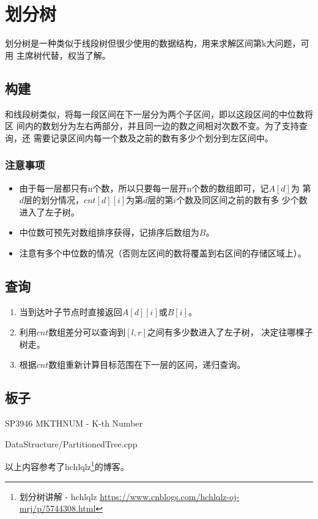 \section{划分树}
划分树是一种类似于线段树但很少使用的数据结构，用来求解区间第k大问题，可用
主席树代替，权当了解。
\subsection{构建}
和线段树类似，将每一段区间在下一层分为两个子区间，即以这段区间的中位数将区
间内的数划分为左右两部分，并且同一边的数之间相对次数不变。为了支持查询，还
需要记录区间内每一个数及之前的数有多少个划分到左区间中。
\subsubsection{注意事项}
\begin{itemize}
    \item 由于每一层都只有n个数，所以只要每一层开n个数的数组即可，记$A[d]$为
    第$d$层的划分情况，$cnt[d][i]$为第$d$层的第$i$个数及同区间之前的数有多
    少个数进入了左子树。
    \item 中位数可预先对数组排序获得，记排序后数组为$B$。
    \item 注意有多个中位数的情况（否则左区间的数将覆盖到右区间的存储区域上）。
\end{itemize}
\subsection{查询}

\begin{enumerate}
    \item 当到达叶子节点时直接返回$A[d][i]$或$B[i]$。
    \item 利用$cnt$数组差分可以查询到$[l,r]$之间有多少数进入了左子树，
    决定往哪棵子树走。
    \item 根据$cnt$数组重新计算目标范围在下一层的区间，递归查询。
\end{enumerate}

\subsection{板子}

SP3946 MKTHNUM - K-th Number


{DataStructure/PartitionedTree.cpp}

以上内容参考了hchlqlz\footnote{划分树讲解 - hchlqlz
\url{https://www.cnblogs.com/hchlqlz-oj-mrj/p/5744308.html}}的博客。
